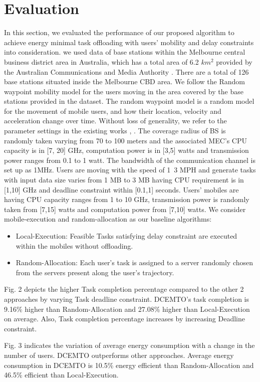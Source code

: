 \documentclass[conference]{IEEEtran}
\begin{document}
\section{Evaluation}
In this section, we evaluated the performance of our proposed algorithm to achieve energy minimal task offloading with users’ mobility and delay constraints into consideration. we used data of base stations within the Melbourne central business district area in Australia, which has a total area of 6.2 $km^2$ provided by the Australian Communications and Media Authority \cite{b6}. There are a total of 126 base stations situated inside the Melbourne CBD area.
	We follow the Random waypoint mobility model for the users moving in the area covered by the base stations provided in the dataset. The random waypoint model is a random model for the movement of mobile users, and how their location, velocity and acceleration change over time. 
	Without loss of generality, we refer to the parameter settings in the existing works \cite{b2}, \cite{b7}. The coverage radius of BS is randomly taken varying from 70 to 100 meters and the associated MEC’s CPU capacity is in [7, 20] GHz, computation power is in [3,5] watts and transmission power ranges from 0.1 to 1 watt. The bandwidth of the communication channel is set up as 1MHz. Users are moving with the speed of 1~3 MPH and generate tasks with input data size varies from 1 MB to 3 MB having CPU requirement is in [1,10] GHz and deadline constraint within [0.1,1] seconds. Users’ mobiles are having CPU capacity ranges from 1 to 10 GHz, transmission power is randomly taken from [7,15] watts and computation power from [7,10] watts. We consider mobile-execution and random-allocation as our baseline algorithms:
\begin{itemize}
\item Local-Execution: Feasible Tasks satisfying delay constraint are executed within the mobiles without offloading. 
\item Random-Allocation: Each user’s task is assigned to a server randomly chosen from the servers present along the user’s trajectory.
\end{itemize}
 
Fig. 2 depicts the higher Task completion percentage compared to the other 2 approaches by varying Task deadline constraint. DCEMTO’s task completion is 9.16\% higher than Random-Allocation and 27.08\% higher than Local-Execution on average. Also, Task completion percentage increases by increasing Deadline constraint.

	Fig. 3 indicates the variation of average energy consumption with a change in the number of users. DCEMTO outperforms other approaches. Average energy consumption in DCEMTO is 10.5\% energy efficient than Random-Allocation and 46.5\% efficient than Local-Execution. 
\end{document}
